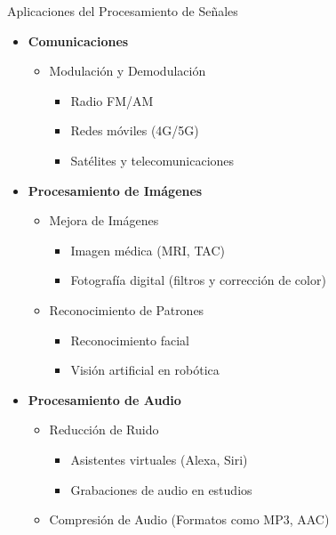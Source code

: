 \begin{frame}{Aplicaciones del Procesamiento de Señales}
  \begin{itemize}
      \scriptsize
      \item \color{red}\textbf{Comunicaciones}\color{black}
      \begin{itemize}
          \scriptsize
          \item Modulación y Demodulación
          \begin{itemize}
              \scriptsize
              \item Radio FM/AM
              \item Redes móviles (4G/5G)
              \item Satélites y telecomunicaciones
          \end{itemize}
      \end{itemize}
  
      \item \color{red}\textbf{Procesamiento de Imágenes}\color{black}
      \begin{itemize}
          \scriptsize
          \item Mejora de Imágenes
          \begin{itemize}
              \scriptsize
              \item Imagen médica (MRI, TAC)
              \item Fotografía digital (filtros y corrección de color)
          \end{itemize}
          \item Reconocimiento de Patrones
          \begin{itemize}
              \scriptsize
              \item Reconocimiento facial
              \item Visión artificial en robótica
          \end{itemize}
      \end{itemize}
  
      \item \color{red}\textbf{Procesamiento de Audio}\color{black}
      \begin{itemize}
          \scriptsize
          \item Reducción de Ruido
          \begin{itemize}
              \scriptsize
              \item Asistentes virtuales (Alexa, Siri)
              \item Grabaciones de audio en estudios
          \end{itemize}
          \item Compresión de Audio (Formatos como MP3, AAC)
      \end{itemize}
  \end{itemize}
\end{frame}

